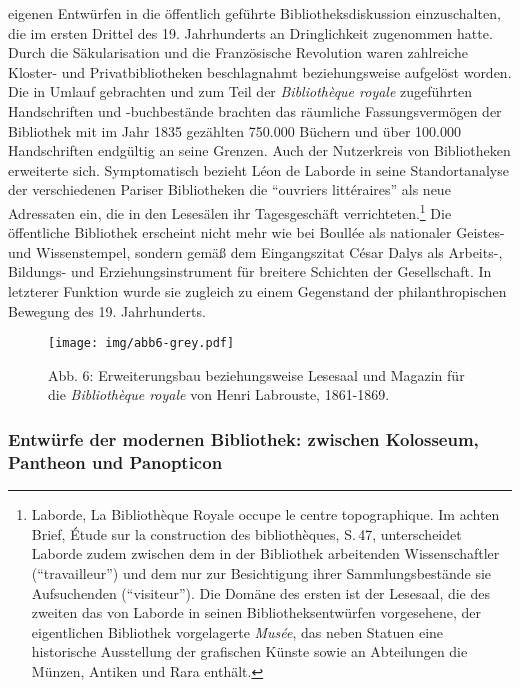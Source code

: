 eigenen Entwürfen in die öffentlich geführte Bibliotheksdiskussion
einzuschalten, die im ersten Drittel des 19. Jahrhunderts an
Dringlichkeit zugenommen hatte. Durch die Säkularisation und die
Französische Revolution waren zahlreiche Kloster- und Privatbibliotheken
beschlagnahmt beziehungsweise aufgelöst worden. Die in Umlauf gebrachten
und zum Teil der \emph{Bibliothèque royale} zugeführten Handschriften
und -buchbestände brachten das räumliche Fassungsvermögen der Bibliothek
mit im Jahr 1835 gezählten 750.000 Büchern und über 100.000
Handschriften endgültig an seine Grenzen. Auch der Nutzerkreis von
Bibliotheken erweiterte sich. Symptomatisch bezieht Léon de Laborde in
seine Standortanalyse der verschiedenen Pariser Bibliotheken die
\enquote{ouvriers littéraires} als neue Adressaten ein, die in den
Lesesälen ihr Tagesgeschäft verrichteten.\footnote{Laborde, La
  Bibliothèque Royale occupe le centre topographique. Im achten Brief,
  Étude sur la construction des bibliothèques, S.\,47, unterscheidet
  Laborde zudem zwischen dem in der Bibliothek arbeitenden
  Wissenschaftler (\enquote{travailleur}) und dem nur zur Besichtigung
  ihrer Sammlungsbestände sie Aufsuchenden (\enquote{visiteur}). Die
  Domäne des ersten ist der Lesesaal, die des zweiten das von Laborde in
  seinen Bibliotheksentwürfen vorgesehene, der eigentlichen Bibliothek
  vorgelagerte \emph{Musée}, das neben Statuen eine historische
  Ausstellung der grafischen Künste sowie an Abteilungen die Münzen,
  Antiken und Rara enthält.} Die öffentliche Bibliothek erscheint nicht
mehr wie bei Boullée als nationaler Geistes- und Wissenstempel, sondern
gemäß dem Eingangszitat César Dalys als Arbeits-, Bildungs- und
Erziehungsinstrument für breitere Schichten der Gesellschaft. In
letzterer Funktion wurde sie zugleich zu einem Gegenstand der
philanthropischen Bewegung des 19. Jahrhunderts.

\begin{figure}[htbp]
\centering
\texttt{[image: img/abb6-grey.pdf]}
\caption*{Abb. 6: Erweiterungsbau beziehungsweise Lesesaal und Magazin für die
\emph{Bibliothèque royale} von Henri Labrouste, 1861-1869.}
\end{figure}

\subsubsection{Entwürfe der modernen Bibliothek: zwischen Kolosseum,
Pantheon und
Panopticon}\label{entwuxfcrfe-der-modernen-bibliothek-zwischen-kolosseum-pantheon-und-panopticon}


